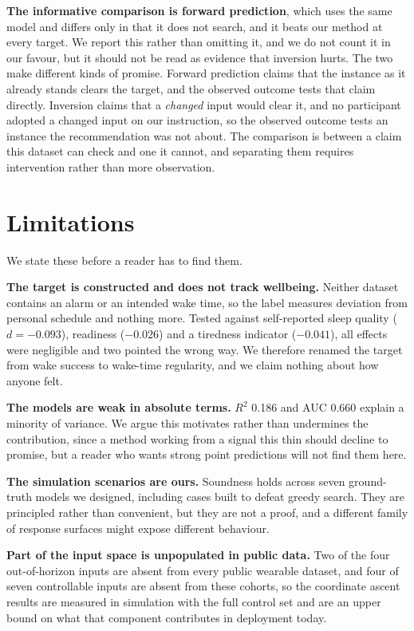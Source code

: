 \documentclass[conference,letterpaper]{IEEEtran}
\begin{document}
\textbf{The informative comparison is forward prediction}, which uses the same
model and differs only in that it does not search, and it beats our method at
every target. We report this rather than omitting it, and we do not count it in
our favour, but it should not be read as evidence that inversion hurts. The two
make different kinds of promise. Forward prediction claims that the instance as
it already stands clears the target, and the observed outcome tests that claim
directly. Inversion claims that a \emph{changed} input would clear it, and no
participant adopted a changed input on our instruction, so the observed outcome
tests an instance the recommendation was not about. The comparison is between a
claim this dataset can check and one it cannot, and separating them requires
intervention rather than more observation.

\section{Limitations}
\label{sec:limitations}

We state these before a reader has to find them.

\textbf{The target is constructed and does not track wellbeing.} Neither dataset
contains an alarm or an intended wake time, so the label measures deviation from
personal schedule and nothing more. Tested against self-reported sleep quality
($d = -0.093$), readiness ($-0.026$) and a tiredness indicator ($-0.041$), all
effects were negligible and two pointed the wrong way. We therefore renamed the
target from wake success to wake-time regularity, and we claim nothing about how
anyone felt.

\textbf{The models are weak in absolute terms.} $R^2$ 0.186 and AUC 0.660
explain a minority of variance. We argue this motivates rather than undermines
the contribution, since a method working from a signal this thin should decline
to promise, but a reader who wants strong point predictions will not find them
here.

\textbf{The simulation scenarios are ours.} Soundness holds across seven
ground-truth models we designed, including cases built to defeat greedy search.
They are principled rather than convenient, but they are not a proof, and a
different family of response surfaces might expose different behaviour.

\textbf{Part of the input space is unpopulated in public data.} Two of the four
out-of-horizon inputs are absent from every public wearable dataset, and four of
seven controllable inputs are absent from these cohorts, so the coordinate
ascent results are measured in simulation with the full control set and are an
upper bound on what that component contributes in deployment today.
\end{document}
